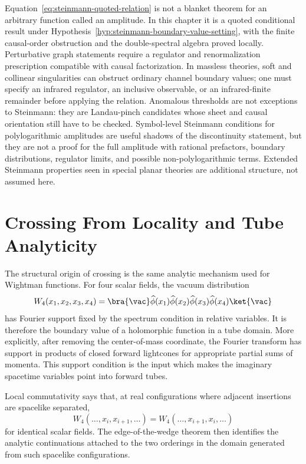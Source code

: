 \begin{warning}
\label{warn:steinmann-status-limitations-variants}
Equation~\eqref{eq:steinmann-quoted-relation} is not a blanket theorem for an
arbitrary function called an amplitude.  In this chapter it is a quoted
conditional result under Hypothesis~\ref{hyp:steinmann-boundary-value-setting},
with the finite causal-order obstruction and the double-spectral algebra proved
locally.  Perturbative graph statements require a regulator and renormalization
prescription compatible with causal factorization.  In massless theories,
soft and collinear singularities can obstruct ordinary channel boundary values;
one must specify an infrared regulator, an inclusive observable, or an
infrared-finite remainder before applying the relation.  Anomalous thresholds
are not exceptions to Steinmann: they are Landau-pinch candidates whose sheet
and causal orientation still have to be checked.  Symbol-level Steinmann
conditions for polylogarithmic amplitudes are useful shadows of the
discontinuity statement, but they are not a proof for the full amplitude with
rational prefactors, boundary distributions, regulator limits, and possible
non-polylogarithmic terms.  Extended Steinmann properties seen in special
planar theories are additional structure, not assumed here.
\end{warning}

\section{Crossing From Locality and Tube Analyticity}

The structural origin of crossing is the same analytic mechanism used for
Wightman functions.  For four scalar fields, the vacuum distribution
\[
  W_4(x_1,x_2,x_3,x_4)
  =
  \bra{\vac}
  \widehat\phi(x_1)\widehat\phi(x_2)
  \widehat\phi(x_3)\widehat\phi(x_4)
  \ket{\vac}
\]
has Fourier support fixed by the spectrum condition in relative variables.
It is therefore the boundary value of a holomorphic function in a tube
domain.  More explicitly, after removing the center-of-mass coordinate, the
Fourier transform has support in products of closed forward lightcones for
appropriate partial sums of momenta.  This support condition is the input
which makes the imaginary spacetime variables point into forward tubes.

Local commutativity says that, at real configurations where adjacent
insertions are spacelike separated,
\[
  W_4(\ldots,x_i,x_{i+1},\ldots)
  =
  W_4(\ldots,x_{i+1},x_i,\ldots)
\]
for identical scalar fields.  The edge-of-the-wedge theorem then identifies
the analytic continuations attached to the two orderings in the domain
generated from such spacelike configurations.

